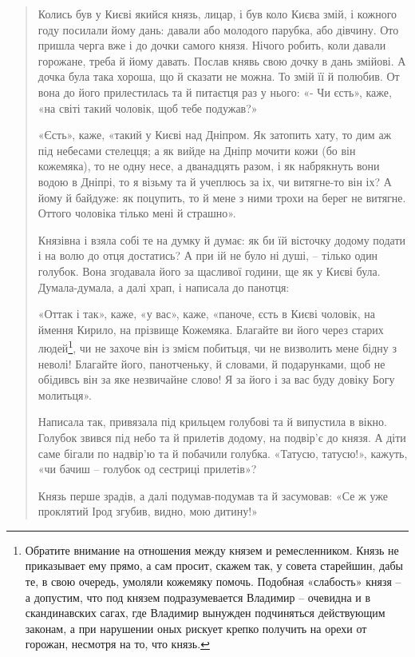 \begin{quotation}
Колись був у Києві якийся князь, лицар, і був коло Києва змій, і кожного году посилали йому дань: давали або молодого парубка, або дівчину. Ото пришла черга вже і до дочки самого князя. Нічого робить, коли давали горожане, треба й йому давать. Послав княвь свою дочку в дань змійові. А дочка була така хороша, що й сказати не можна. То змій її й полюбив. От вона до його прилестилась та й питаєтця раз у нього: «- Чи єсть», каже, «на світі такий чоловік, щоб тебе подужав?»

«Єсть», каже, «такий у Києві над Дніпром. Як затопить хату, то дим аж під небесами стелецця; а як вийде на Дніпр мочити кожи (бо він кожемяка), то не одну несе, а дванадцять разом, і як набрякнуть вони водою в Дніпрі, то я візьму та й учеплюсь за іх, чи витягне-то він іх? А йому й байдуже: як поцупить, то й мене з ними трохи на берег не витягне. Оттого чоловіка тілько мені й страшно».

Князівна і взяла собі те на думку й думає: як би їй вісточку додому подати і на волю до отця достатись? А при ій не було ні душі, – тілько один голубок. Вона згодавала його за щасливої години, ще як у Києві була. Думала-думала, а далі храп, і написала до панотця:

«Оттак і так», каже, «у вас», каже, «паноче, єсть в Києві чоловік, на ймення Кирило, на прізвище Кожемяка. Благайте ви його через старих людей\footnote{Обратите внимание на отношения между князем и ремесленником. Князь не приказывает ему прямо, а сам просит, скажем так, у совета старейшин, дабы те, в свою очередь, умоляли кожемяку помочь. Подобная «слабость» князя – а допустим, что под князем подразумевается Владимир – очевидна и в скандинавских сагах, где Владимир вынужден подчиняться действующим законам, а при нарушении оных рискует крепко получить на орехи от горожан, несмотря на то, что князь.}, чи не захоче він із змієм побитьця, чи не визволить мене бідну з неволі! Благайте його, панотченьку, й словами, й подарунками, щоб не обідивсь він за яке незвичайне слово! Я за його і за вас буду довіку Богу молитьця».

Написала так, привязала під крильцем голубові та й випустила в вікно. Голубок звився під небо та й прилетів додому, на подвір'є до князя. А діти саме бігали по надвір'ю та й побачили голубка. «Татусю, татусю!», кажуть, «чи бачиш – голубок од сестриці прилетів»?

Князь перше зрадів, а далі подумав-подумав та й засумовав: «Се ж уже проклятий Ірод згубив, видно, мою дитину!»


\end{quotation}
